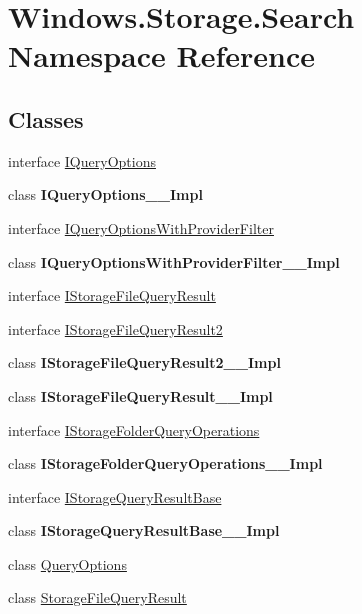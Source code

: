 \hypertarget{namespace_windows_1_1_storage_1_1_search}{}\section{Windows.\+Storage.\+Search Namespace Reference}
\label{namespace_windows_1_1_storage_1_1_search}
\subsection*{Classes}
\begin{DoxyCompactItemize}
\item 
interface \hyperlink{interface_windows_1_1_storage_1_1_search_1_1_i_query_options}{I\+Query\+Options}
\item 
class {\bfseries I\+Query\+Options\+\_\+\+\_\+\+Impl}
\item 
interface \hyperlink{interface_windows_1_1_storage_1_1_search_1_1_i_query_options_with_provider_filter}{I\+Query\+Options\+With\+Provider\+Filter}
\item 
class {\bfseries I\+Query\+Options\+With\+Provider\+Filter\+\_\+\+\_\+\+Impl}
\item 
interface \hyperlink{interface_windows_1_1_storage_1_1_search_1_1_i_storage_file_query_result}{I\+Storage\+File\+Query\+Result}
\item 
interface \hyperlink{interface_windows_1_1_storage_1_1_search_1_1_i_storage_file_query_result2}{I\+Storage\+File\+Query\+Result2}
\item 
class {\bfseries I\+Storage\+File\+Query\+Result2\+\_\+\+\_\+\+Impl}
\item 
class {\bfseries I\+Storage\+File\+Query\+Result\+\_\+\+\_\+\+Impl}
\item 
interface \hyperlink{interface_windows_1_1_storage_1_1_search_1_1_i_storage_folder_query_operations}{I\+Storage\+Folder\+Query\+Operations}
\item 
class {\bfseries I\+Storage\+Folder\+Query\+Operations\+\_\+\+\_\+\+Impl}
\item 
interface \hyperlink{interface_windows_1_1_storage_1_1_search_1_1_i_storage_query_result_base}{I\+Storage\+Query\+Result\+Base}
\item 
class {\bfseries I\+Storage\+Query\+Result\+Base\+\_\+\+\_\+\+Impl}
\item 
class \hyperlink{class_windows_1_1_storage_1_1_search_1_1_query_options}{Query\+Options}
\item 
class \hyperlink{class_windows_1_1_storage_1_1_search_1_1_storage_file_query_result}{Storage\+File\+Query\+Result}
\end{DoxyCompactItemize}
